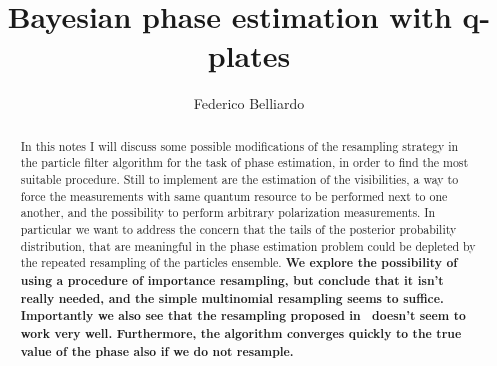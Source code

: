 \documentclass[aps, pra, 10pt, twocolumn, superscriptaddress,floatfix]{revtex4-1}
\begin{document}
%
\title{Bayesian phase estimation with q-plates}

\begin{abstract}
	In this notes I will discuss some possible modifications of the resampling strategy in the particle filter algorithm for the task of phase estimation, in order to find the most suitable procedure. Still to implement are the estimation of the visibilities, a way to force the measurements with same quantum resource to be performed next to one another, and the possibility to perform arbitrary polarization measurements. In particular we want to address the concern that the tails of the posterior probability distribution, that are meaningful in the phase estimation problem could be depleted by the repeated resampling of the particles ensemble. \textbf{We explore the possibility of using a procedure of importance resampling, but conclude that it isn't really needed, and the simple multinomial resampling seems to suffice. Importantly we also see that the resampling proposed in~\cite{Granade2012} doesn't seem to work very well. Furthermore, the algorithm converges quickly to the true value of the phase also if we do not resample.}
\end{abstract} 
%

\author{Federico Belliardo}

\maketitle
\end{document}
